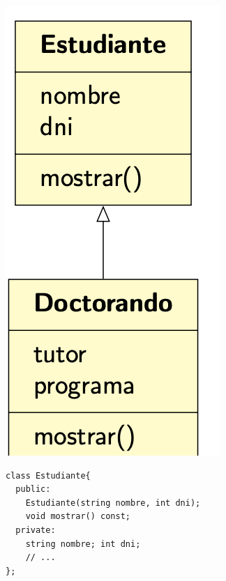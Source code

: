\begin{figure}[h]
	\begin{minipage}[t]{0.25\textwidth}
	\includegraphics[width=\textwidth]{Imagenes/gen5.png}
	\end{minipage}
\hfill
\begin{minipage}[t]{0.7\textwidth}
\vspace*{-8cm}
	\begin{lstlisting}[frame=single]
class Estudiante{
  public:
    Estudiante(string nombre, int dni);
    void mostrar() const;
  private:
    string nombre; int dni;
    // ...
};


\end{lstlisting}
\end{minipage}
\end{figure}
